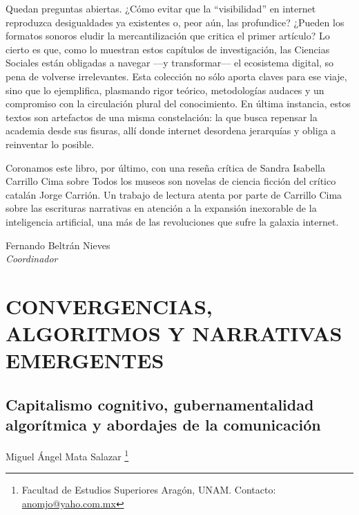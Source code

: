 \documentclass[
  spanish,
  11pt,
  a4paper,
]{scrbook}
\begin{document}
Quedan preguntas abiertas. ¿Cómo evitar que la ``visibilidad'' en
internet reproduzca desigualdades ya existentes o, peor aún, las
profundice? ¿Pueden los formatos sonoros eludir la mercantilización que
critica el primer artículo? Lo cierto es que, como lo muestran estos
capítulos de investigación, las Ciencias Sociales están obligadas a
navegar ---y transformar--- el ecosistema digital, so pena de volverse
irrelevantes. Esta colección no sólo aporta claves para ese viaje, sino
que lo ejemplifica, plasmando rigor teórico, metodologías audaces y un
compromiso con la circulación plural del conocimiento. En última
instancia, estos textos son artefactos de una misma constelación: la que
busca repensar la academia desde sus fisuras, allí donde internet
desordena jerarquías y obliga a reinventar lo posible.

Coronamos este libro, por último, con una reseña crítica de Sandra
Isabella Carrillo Cima sobre Todos los museos son novelas de ciencia
ficción del crítico catalán Jorge Carrión. Un trabajo de lectura atenta
por parte de Carrillo Cima sobre las escrituras narrativas en atención a
la expansión inexorable de la inteligencia artificial, una más de las
revoluciones que sufre la galaxia internet.

\begin{flushright}
\Large Fernando Beltrán Nieves\\

\Large \textit{Coordinador}
\end{flushright}

\part{CONVERGENCIAS, ALGORITMOS Y NARRATIVAS EMERGENTES}

\chapter{Capitalismo cognitivo, gubernamentalidad algorítmica y
abordajes de la
comunicación}\label{capitalismo-cognitivo-gubernamentalidad-algoruxedtmica-y-abordajes-de-la-comunicaciuxf3n}


\begin{flushright}
\Large Miguel Ángel Mata Salazar \footnote{Facultad de Estudios Superiores Aragón, UNAM. Contacto: \href{anomjo@yaho.com.mx}{anomjo@yaho.com.mx}}
\end{flushright}
\end{document}

